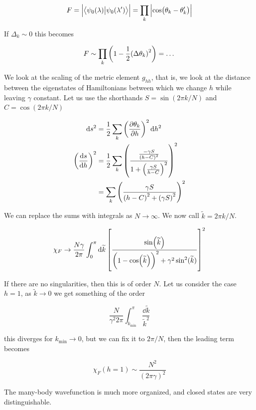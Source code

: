\documentclass[main.tex]{subfiles}
\begin{document}
\begin{equation}
    F = \abs{\braket{\psi_0 (\lambda)}{\psi_0 (\lambda')} } = \prod _k \abs{\cos(\theta_k - \theta_k ')}
\end{equation}

If \(\Delta_k \sim 0\) this becomes

\begin{equation}
    F \sim \prod_k \qty(1 - \frac{1}{2} \qty(\Delta \theta_k)^2) = \dots
\end{equation}

We look at the scaling of the metric element \(g _{hh} \), that is, we look at the distance between the eigenstates of Hamiltonians between which we change \(h\) while leaving \(\gamma\) constant. Let us use the shorthands \(S = \sin(2 \pi k /N)\) and \(C = \cos(2 \pi k /N)\)

\begin{subequations}
\begin{align}
    \dd{s^2} &= \frac{1}{2} \sum _{k}  \qty(\pdv{\theta_k}{h})^2 \dd{h^2}  \\
    \qty(\dv{s}{h})^2 &= \frac{1}{2} \sum _{k}
    \qty(\frac{\frac{-\gamma S}{\qty(h - C)^2}}{1 + \qty(\frac{\gamma S}{h - C})^2})^2  \\
    &= \sum _{k} \qty( \frac{\gamma S}{\qty(h - C)^2 + \qty(\gamma S)^2})^2
\end{align}
\end{subequations}

We can replace the sums with integrals as \(N \rightarrow \infty\). We now call \(\widetilde{k}=2\pi k / N \).

\begin{equation}
    \chi_F  \rightarrow \frac{N \gamma }{2 \pi} \int _{0}   ^{\pi} \dd{\widetilde{k}}
    \qty[\frac{\sin(\widetilde{k} ) }{\qty(1 - \cos(\widetilde{k} ) )^2 + \gamma^2 \sin^2(\widetilde{k} ) }]^2
\end{equation}

If there are no singularities, then this is of order \(N\). Let us consider the case \(h = 1\),
as \(\widetilde{k} \rightarrow 0\) we get something of the order

\begin{equation}
    \frac{N}{\gamma^2 2 \pi } \int   _{k _{\text{min}}} ^{\pi }  \frac{\dd{\widetilde{k} }}{\widetilde{k}^2 }
\end{equation}

this diverges for \(k _{\text{min}} \rightarrow 0 \), but we can fix it to \(2 \pi / N\), then the leading term becomes

\begin{equation}
    \chi_F (h = 1) \sim \frac{N^2}{(2 \pi \gamma)^2}
\end{equation}

The many-body wavefunction is much more organized, and closed states are very distinguishable.
\end{document}
